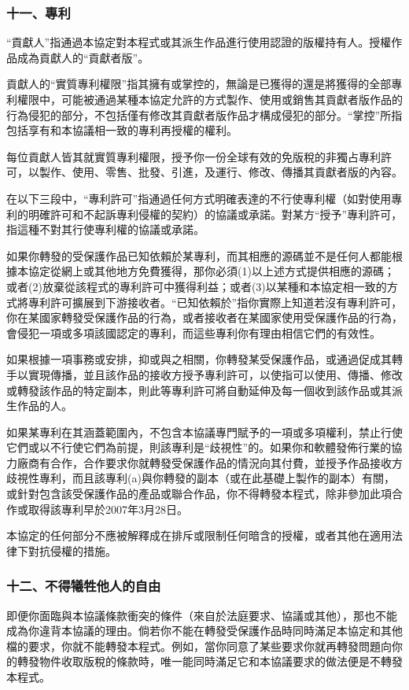 \subsubsection{十一、專利}
“貢獻人”指通過本協定對本程式或其派生作品進行使用認證的版權持有人。授權作品成為貢獻人的“貢獻者版”。\par
貢獻人的“實質專利權限”指其擁有或掌控的，無論是已獲得的還是將獲得的全部專利權限中，可能被通過某種本協定允許的方式製作、使用或銷售其貢獻者版作品的行為侵犯的部分，不包括僅有修改其貢獻者版作品才構成侵犯的部分。“掌控”所指包括享有和本協議相一致的專利再授權的權利。\par
每位貢獻人皆其就實質專利權限，授予你一份全球有效的免版稅的非獨占專利許可，以製作、使用、零售、批發、引進，及運行、修改、傳播其貢獻者版的內容。\par
在以下三段中，“專利許可”指通過任何方式明確表達的不行使專利權（如對使用專利的明確許可和不起訴專利侵權的契約）的協議或承諾。對某方“授予”專利許可，指這種不對其行使專利權的協議或承諾。\par
如果你轉發的受保護作品已知依賴於某專利，而其相應的源碼並不是任何人都能根據本協定從網上或其他地方免費獲得，那你必須(1)以上述方式提供相應的源碼；或者(2)放棄從該程式的專利許可中獲得利益；或者(3)以某種和本協定相一致的方式將專利許可擴展到下游接收者。“已知依賴於”指你實際上知道若沒有專利許可，你在某國家轉發受保護作品的行為，或者接收者在某國家使用受保護作品的行為，會侵犯一項或多項該國認定的專利，而這些專利你有理由相信它們的有效性。\par
如果根據一項事務或安排，抑或與之相關，你轉發某受保護作品，或通過促成其轉手以實現傳播，並且該作品的接收方授予專利許可，以使指可以使用、傳播、修改或轉發該作品的特定副本，則此等專利許可將自動延伸及每一個收到該作品或其派生作品的人。\par
如果某專利在其涵蓋範圍內，不包含本協議專門賦予的一項或多項權利，禁止行使它們或以不行使它們為前提，則該專利是“歧視性”的。如果你和軟體發佈行業的協力廠商有合作，合作要求你就轉發受保護作品的情況向其付費，並授予作品接收方歧視性專利，而且該專利(a)與你轉發的副本（或在此基礎上製作的副本）有關，或針對包含該受保護作品的產品或聯合作品，你不得轉發本程式，除非參加此項合作或取得該專利早於2007年3月28日。\par
本協定的任何部分不應被解釋成在排斥或限制任何暗含的授權，或者其他在適用法律下對抗侵權的措施。
\subsubsection{十二、不得犧牲他人的自由}
即便你面臨與本協議條款衝突的條件（來自於法庭要求、協議或其他），那也不能成為你違背本協議的理由。倘若你不能在轉發受保護作品時同時滿足本協定和其他檔的要求，你就不能轉發本程式。例如，當你同意了某些要求你就再轉發問題向你的轉發物件收取版稅的條款時，唯一能同時滿足它和本協議要求的做法便是不轉發本程式。
